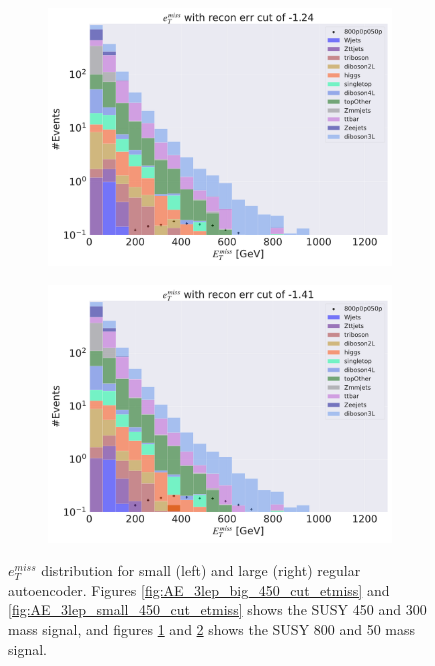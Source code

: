 \begin{figure}[H]
    \hfill
    \begin{subfigure}{.45\textwidth}
        \includegraphics[width=\textwidth]{Figures/AE_testing/big/3lep/b_data_recon_big_rm3_feats_sig_800p0p050p_etmiss_recon_errcut_-1.24.pdf}
        \caption{}
        \label{fig:AE_3lep_big_800_cut_etmiss}
    \end{subfigure}
    \hfill   
    \begin{subfigure}{.45\textwidth}
        \includegraphics[width=\textwidth]{Figures/AE_testing/small/3lep/b_data_recon_big_rm3_feats_sig_800p0p050p_etmiss_recon_errcut_-1.41.pdf}
        \caption{}
        \label{fig:AE_3lep_small_800_cut_etmiss}
    \end{subfigure}
    \hfill      
    \caption[Some $e_T^{miss}$ cuts for AE]{$e_T^{miss}$ distribution for small (left) and large (right) regular autoencoder.
    Figures \ref{fig:AE_3lep_big_450_cut_etmiss} and \ref{fig:AE_3lep_small_450_cut_etmiss} shows the SUSY 450 and 300 mass signal, 
    and figures \ref{fig:AE_3lep_big_800_cut_etmiss} and \ref{fig:AE_3lep_small_800_cut_etmiss} shows the SUSY 800 and 50 mass signal.}
    \label{fig:AE_3lep_recon_err_both_sig_cut_etmiss}
\end{figure}

